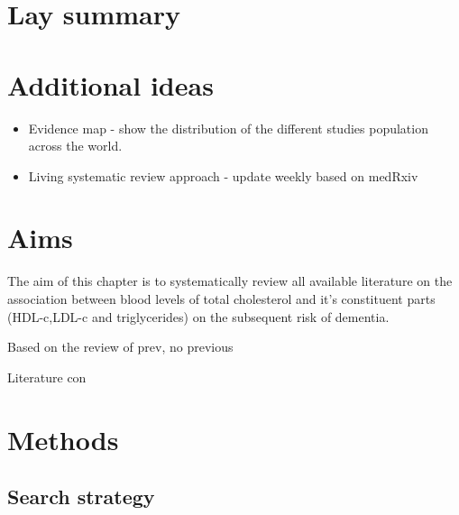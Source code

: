 \documentclass[a4paper, twoside]{templates/ociamthesis}
\providecommand{\tightlist}{%
  \setlength{\itemsep}{0pt}\setlength{\parskip}{0pt}}
\begin{document}
\hypertarget{lay-summary-2}{%
\section{Lay summary}\label{lay-summary-2}}

\hypertarget{additional-ideas-1}{%
\section{Additional ideas}\label{additional-ideas-1}}

\begin{itemize}
\tightlist
\item
  Evidence map - show the distribution of the different studies population across the world.
\item
  Living systematic review approach - update weekly based on medRxiv
\end{itemize}

\hypertarget{aims}{%
\section{Aims}\label{aims}}

The aim of this chapter is to systematically review all available literature on the association between blood levels of total cholesterol and it's constituent parts (HDL-c,LDL-c and triglycerides) on the subsequent risk of dementia.

Based on the review of prev, no previous

Literature con

\hypertarget{methods}{%
\section{Methods}\label{methods}}

\hypertarget{search-strategy}{%
\subsection{Search strategy}\label{search-strategy}}
\end{document}
